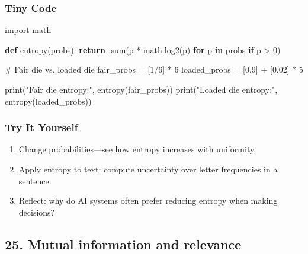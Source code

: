 \documentclass[
  letterpaper,
  DIV=11,
  numbers=noendperiod]{scrreprt}
\newenvironment{Shaded}{\begin{snugshade}}{\end{snugshade}}
\newcommand{\BuiltInTok}[1]{\textcolor[rgb]{0.00,0.23,0.31}{#1}}
\newcommand{\CommentTok}[1]{\textcolor[rgb]{0.37,0.37,0.37}{#1}}
\newcommand{\ControlFlowTok}[1]{\textcolor[rgb]{0.00,0.23,0.31}{\textbf{#1}}}
\newcommand{\DecValTok}[1]{\textcolor[rgb]{0.68,0.00,0.00}{#1}}
\newcommand{\FloatTok}[1]{\textcolor[rgb]{0.68,0.00,0.00}{#1}}
\newcommand{\ImportTok}[1]{\textcolor[rgb]{0.00,0.46,0.62}{#1}}
\newcommand{\KeywordTok}[1]{\textcolor[rgb]{0.00,0.23,0.31}{\textbf{#1}}}
\newcommand{\NormalTok}[1]{\textcolor[rgb]{0.00,0.23,0.31}{#1}}
\newcommand{\OperatorTok}[1]{\textcolor[rgb]{0.37,0.37,0.37}{#1}}
\newcommand{\StringTok}[1]{\textcolor[rgb]{0.13,0.47,0.30}{#1}}
\providecommand{\tightlist}{%
  \setlength{\itemsep}{0pt}\setlength{\parskip}{0pt}}
\begin{document}
\subsubsection{Tiny Code}\label{tiny-code-23}

\begin{Shaded}
\begin{Highlighting}[]
\ImportTok{import}\NormalTok{ math}

\KeywordTok{def}\NormalTok{ entropy(probs):}
    \ControlFlowTok{return} \OperatorTok{{-}}\BuiltInTok{sum}\NormalTok{(p }\OperatorTok{*}\NormalTok{ math.log2(p) }\ControlFlowTok{for}\NormalTok{ p }\KeywordTok{in}\NormalTok{ probs }\ControlFlowTok{if}\NormalTok{ p }\OperatorTok{\textgreater{}} \DecValTok{0}\NormalTok{)}

\CommentTok{\# Fair die vs. loaded die}
\NormalTok{fair\_probs }\OperatorTok{=}\NormalTok{ [}\DecValTok{1}\OperatorTok{/}\DecValTok{6}\NormalTok{] }\OperatorTok{*} \DecValTok{6}
\NormalTok{loaded\_probs }\OperatorTok{=}\NormalTok{ [}\FloatTok{0.9}\NormalTok{] }\OperatorTok{+}\NormalTok{ [}\FloatTok{0.02}\NormalTok{] }\OperatorTok{*} \DecValTok{5}

\BuiltInTok{print}\NormalTok{(}\StringTok{"Fair die entropy:"}\NormalTok{, entropy(fair\_probs))}
\BuiltInTok{print}\NormalTok{(}\StringTok{"Loaded die entropy:"}\NormalTok{, entropy(loaded\_probs))}
\end{Highlighting}
\end{Shaded}

\subsubsection{Try It Yourself}\label{try-it-yourself-23}

\begin{enumerate}
\def\labelenumi{\arabic{enumi}.}
\tightlist
\item
  Change probabilities---see how entropy increases with uniformity.
\item
  Apply entropy to text: compute uncertainty over letter frequencies in
  a sentence.
\item
  Reflect: why do AI systems often prefer reducing entropy when making
  decisions?
\end{enumerate}

\subsection{25. Mutual information and
relevance}\label{mutual-information-and-relevance}
\end{document}
